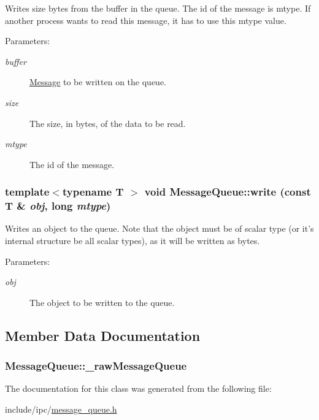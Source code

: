 Writes size bytes from the buffer in the queue. The id of the message is mtype. If another process wants to read this message, it has to use this mtype value.

\begin{Desc}
\item[Parameters:]
\begin{description}
\item[{\em buffer}]\hyperlink{classMessage}{Message} to be written on the queue. \item[{\em size}]The size, in bytes, of the data to be read. \item[{\em mtype}]The id of the message. \end{description}
\end{Desc}
\hypertarget{classMessageQueue_f92446b6f5dff6ffb4f523c85c066ad9}{
\subsubsection[{write}]{\setlength{\rightskip}{0pt plus 5cm}template$<$typename T $>$ void MessageQueue::write (const T \& {\em obj}, \/  long {\em mtype})}}
\label{classMessageQueue_f92446b6f5dff6ffb4f523c85c066ad9}


Writes an object to the queue. Note that the object must be of scalar type (or it's internal structure be all scalar types), as it will be written as bytes.

\begin{Desc}
\item[Parameters:]
\begin{description}
\item[{\em obj}]The object to be written to the queue. \end{description}
\end{Desc}


\subsection{Member Data Documentation}
\hypertarget{classMessageQueue_28ee84422ed78459c2e92909c99dc1f4}{
\subsubsection[{\_\-rawMessageQueue}]{ {\bf MessageQueue::\_\-rawMessageQueue}}}
\label{classMessageQueue_28ee84422ed78459c2e92909c99dc1f4}




The documentation for this class was generated from the following file:\begin{CompactItemize}
\item 
include/ipc/\hyperlink{message__queue_8h}{message\_\-queue.h}\end{CompactItemize}
